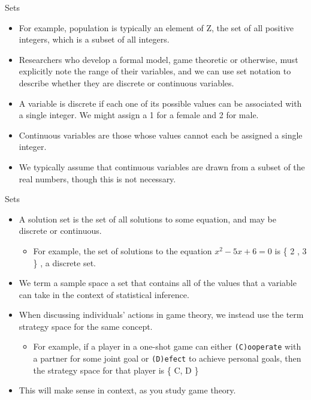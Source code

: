 \documentclass[
  ignorenonframetext,
]{beamer}
\providecommand{\tightlist}{%
  \setlength{\itemsep}{0pt}\setlength{\parskip}{0pt}}
\begin{document}
\begin{frame}{Sets}
\protect\hypertarget{sets-1}{}

\begin{itemize}
\item
  For example, population is typically an element of Z, the set of all
  positive integers, which is a subset of all integers.
\item
  Researchers who develop a formal model, game theoretic or otherwise,
  must explicitly note the range of their variables, and we can use set
  notation to describe whether they are discrete or continuous
  variables.
\item
  A variable is discrete if each one of its possible values can be
  associated with a single integer. We might assign a 1 for a female and
  2 for male.
\item
  Continuous variables are those whose values cannot each be assigned a
  single integer.
\item
  We typically assume that continuous variables are drawn from a subset
  of the real numbers, though this is not necessary.
\end{itemize}

\end{frame}

\begin{frame}[fragile]{Sets}
\protect\hypertarget{sets-2}{}

\begin{itemize}
\item
  A solution set is the set of all solutions to some equation, and may
  be discrete or continuous.

  \begin{itemize}
  \tightlist
  \item
    For example, the set of solutions to the equation
    \(x^2 − 5 x +6 = 0\) is \{ 2 , 3 \} , a discrete set.
  \end{itemize}
\item
  We term a sample space a set that contains all of the values that a
  variable can take in the context of statistical inference.
\item
  When discussing individuals' actions in game theory, we instead use
  the term strategy space for the same concept.

  \begin{itemize}
  \tightlist
  \item
    For example, if a player in a one-shot game can either
    \texttt{(C)ooperate} with a partner for some joint goal or
    \texttt{(D)efect} to achieve personal goals, then the strategy space
    for that player is \{ C, D \}
  \end{itemize}
\item
  This will make sense in context, as you study game theory.
\end{itemize}

\end{frame}
\end{document}
